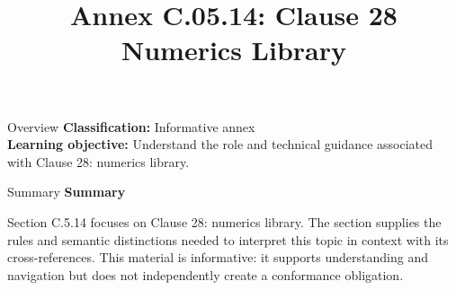\documentclass[10pt,letterpaper]{article}
\title{Annex C.05.14: Clause 28 Numerics Library}
\author{}
\date{}
\begin{document}
\maketitle
\begin{CornellOverviewBox}{Overview}
\textbf{Classification:} Informative annex\\[2pt]
\textbf{Learning objective:} Understand the role and technical guidance associated with Clause 28: numerics library.
\end{CornellOverviewBox}\begin{CornellSummaryBox}{Summary}
{\sffamily\bfseries\color{Accent} Summary}\par\vspace{3pt}Section C.5.14 focuses on Clause 28: numerics library. The section supplies the rules and semantic distinctions needed to interpret this topic in context with its cross-references. This material is informative: it supports understanding and navigation but does not independently create a conformance obligation.
\end{CornellSummaryBox}
\end{document}
